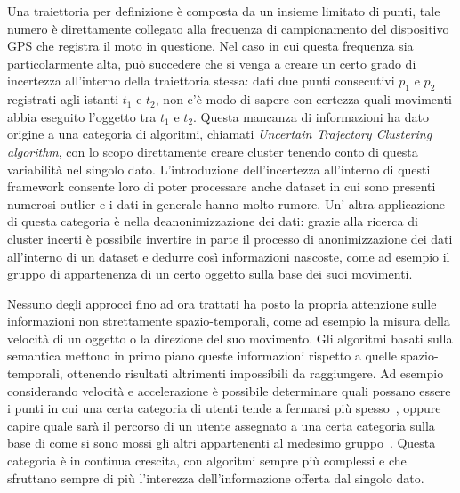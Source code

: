 Una traiettoria per definizione è composta da un insieme limitato di punti, tale numero
è direttamente collegato alla frequenza di campionamento del dispositivo GPS che registra
il moto in questione.
Nel caso in cui questa frequenza sia particolarmente alta, può succedere che si venga a creare
un certo grado di incertezza all'interno della traiettoria stessa: dati due punti consecutivi
\(p_{1}\) e \(p_{2}\) registrati agli istanti \(t_{1}\) e \(t_{2}\), non c'è modo di sapere con certezza quali
movimenti abbia eseguito l'oggetto tra  \(t_{1}\) e \(t_{2}\).
Questa mancanza di informazioni ha dato origine a una categoria di algoritmi,
chiamati \textit{Uncertain Trajectory Clustering algorithm}, con lo scopo direttamente
creare cluster tenendo conto di questa variabilità nel singolo dato.
L'introduzione dell'incertezza all'interno di questi framework consente loro di poter
processare anche dataset in cui sono presenti numerosi outlier e i dati in generale
hanno molto rumore.
Un' altra applicazione di questa categoria è nella deanonimizzazione dei dati: grazie
alla ricerca di cluster incerti è possibile invertire in parte il processo di anonimizzazione
dei dati all'interno di un dataset e dedurre così informazioni nascoste, come
ad esempio il gruppo di appartenenza di un certo oggetto sulla base dei suoi movimenti.

Nessuno degli approcci fino ad ora trattati ha posto la propria attenzione sulle informazioni non
strettamente spazio-temporali, come ad esempio la misura della velocità di un oggetto
o la direzione del suo movimento.
Gli algoritmi basati sulla semantica mettono in primo piano queste informazioni rispetto a quelle
spazio-temporali, ottenendo risultati altrimenti impossibili da raggiungere.
Ad esempio considerando velocità e accelerazione è possibile determinare quali possano
essere i punti in cui una certa categoria di utenti tende a fermarsi più spesso~\cite{zheng2008understanding},
oppure capire quale sarà il percorso di un utente assegnato a una certa categoria sulla base
di come si sono mossi gli altri appartenenti al medesimo gruppo~\cite{ying2011semantic}.
Questa categoria è in continua crescita, con algoritmi sempre più complessi e che sfruttano sempre di
più l'interezza dell'informazione offerta dal singolo dato.